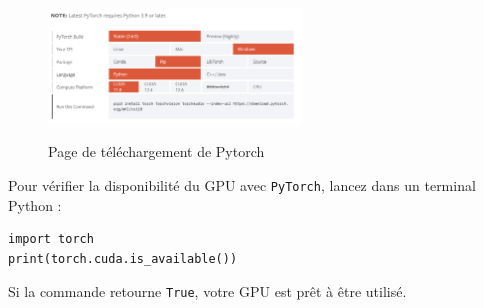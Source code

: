 \begin{figure}[H]
    \centering
    \href{https://pytorch.org/get-started/locally/}{\includegraphics[width=0.6\textwidth]{GuideUtilisateur/pytorch.png}}
    \caption{Page de téléchargement de Pytorch}
\end{figure}

Pour vérifier la disponibilité du GPU avec \texttt{PyTorch}, lancez dans un terminal Python :
\begin{verbatim}
import torch
print(torch.cuda.is_available())
\end{verbatim}
Si la commande retourne \texttt{True}, votre GPU est prêt à être utilisé.